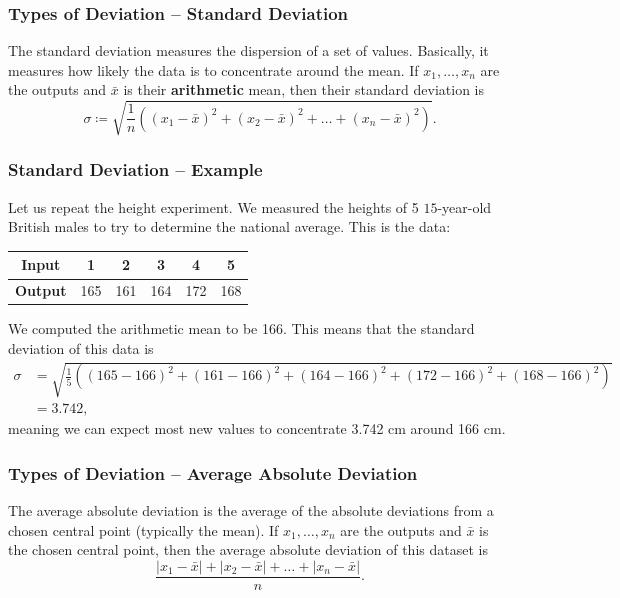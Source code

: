 \documentclass[aspectratio=169,11pt,svgnames]{beamer}
\begin{document}
\begin{frame}
 \frametitle{Types of Deviation -- Standard Deviation}
 \begin{tcolorbox}[title=Standard Deviation]
  The \alert{standard deviation} measures the dispersion of a set of values.
  Basically, it measures how likely the data is to concentrate around the mean.
  If $x_1,\ldots,x_n$ are the outputs and $\bar{x}$ is their \textbf{arithmetic}
  mean, then their standard deviation is
  \[
   \sigma \coloneqq \sqrt{\frac{1}{n}((x_1-\bar{x})^2 +
   (x_2-\bar{x})^2+\ldots+(x_n-\bar{x})^2)}.
  \]
 \end{tcolorbox}
\end{frame}

\begin{frame}
 \frametitle{Standard Deviation -- Example}
 Let us repeat the height experiment. We measured the heights of 5 $15$-year-old
 British males to try to determine the national average. This is the data:
 \begin{center}
  \begin{tabular}{c|ccccc}
   \textbf{Input} & 1 & 2 & 3 & 4 & 5\\
   \midrule
   \textbf{Output} & 165 & 161 & 164 & 172 & 168
  \end{tabular}
 \end{center}
 \pause
 We computed the arithmetic mean to be 166. This means that the standard
 deviation of this data is
 \begin{align*}
  \sigma &= \sqrt{\frac{1}{5}((165 - 166)^2 + (161 -166)^2 + (164 - 166)^2 +
  (172-166)^2 + (168-166)^2)}\\
         &= 3.742,
 \end{align*}
 meaning we can expect most new values to concentrate 3.742 cm around 166 cm.
\end{frame}

\begin{frame}
 \frametitle{Types of Deviation -- Average Absolute Deviation}
 \begin{tcolorbox}[title=Average Absolute Deviation]
  The \alert{average absolute deviation} is the average of the absolute
  deviations from a chosen central point (typically the mean). If
  $x_1,\ldots,x_n$ are the outputs and $\bar{x}$ is the chosen central point,
  then the average absolute deviation of this dataset is
  \[
   \frac{|x_1 - \bar{x}| + |x_2 - \bar{x}| + \ldots + |x_n -\bar{x}|}{n}.
  \]
 \end{tcolorbox}
\end{frame}
\end{document}
